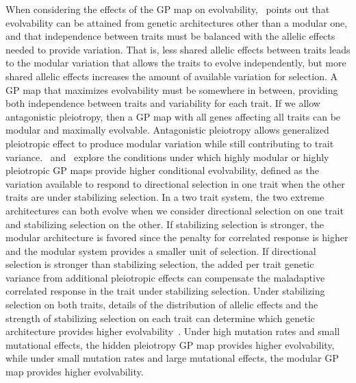 \begin{refsection}
When considering the effects of the GP map on
evolvability,~\textcite{Hansen2003-fh} points out that evolvability can be
attained from genetic architectures other than a modular one, and that
independence between traits must be balanced with the allelic effects needed
to provide variation. That is, less shared allelic effects between
traits leads to the modular variation that allows the traits to evolve
independently, but more shared allelic effects increases the amount of
available variation for selection. A GP map that maximizes
evolvability must be somewhere in between, providing both independence between
traits and variability for each trait. If we allow antagonistic pleiotropy,
then a GP map with all genes affecting all traits can be modular and maximally
evolvable. Antagonistic pleiotropy allows generalized pleiotropic effect to
produce modular variation while still contributing to trait
variance.~\textcite{Hansen2003-fh} and~\textcite{Pavlicev2011-xm} explore the
conditions under which highly modular or highly pleiotropic GP maps provide
higher conditional evolvability, defined as the variation available to respond
to directional selection in one trait when the other traits are under
stabilizing selection. In a two trait system, the two extreme architectures
can both evolve when we consider directional selection on one trait and
stabilizing selection on the other. If stabilizing selection is stronger, the
modular architecture is favored since the penalty for correlated response is
higher and the modular system provides a smaller unit of selection. If
directional selection is stronger than stabilizing selection, the added per
trait genetic variance from additional pleiotropic effects can compensate the
maladaptive correlated response in the trait under stabilizing selection.
Under stabilizing selection on both traits, details of the distribution of
allelic effects and the strength of stabilizing selection on each trait can
determine which genetic architecture provides higher
evolvability~\parencite{Pavlicev2011-xm}. Under high mutation rates and small
mutational effects, the hidden pleiotropy GP map provides higher evolvability,
while under small mutation rates and large mutational effects, the modular GP
map provides higher evolvability.


\end{refsection}
